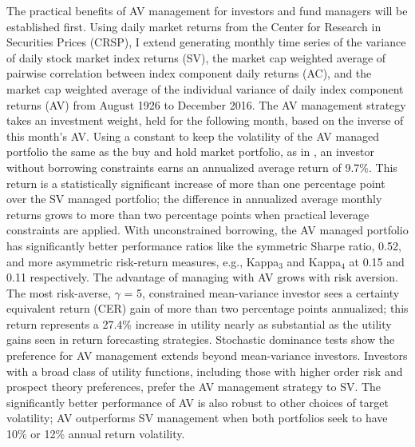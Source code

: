 The practical benefits of AV management for investors and fund managers will be established first. Using daily market returns from the Center for Research in Securities Prices (CRSP), I extend \citet{pollet_average_2010} generating monthly time series of the variance of daily stock market index returns (SV), the market cap weighted average of pairwise correlation between index component daily returns (AC), and the market cap weighted average of the individual variance of daily index component returns (AV) from August 1926 to December 2016. The AV management strategy takes an investment weight, held for the following month, based on the inverse of this month's AV. Using a constant to keep the volatility of the AV managed portfolio the same as the buy and hold market portfolio, as in \citet{moreira_volatility-managed_2017}, an investor without borrowing constraints earns an annualized average return of 9.7\%. This return is a statistically significant increase of more than one percentage point over the SV managed portfolio; the difference in annualized average monthly returns grows to more than two percentage points when practical leverage constraints are applied. With unconstrained borrowing, the AV managed portfolio has significantly better performance ratios like the symmetric Sharpe ratio, 0.52, and more asymmetric risk-return measures, e.g., Kappa$_{3}$ and Kappa$_{4}$ at 0.15 and 0.11 respectively. The advantage of managing with AV grows with risk aversion. The most risk-averse, $\gamma$ = 5, constrained mean-variance investor sees a certainty equivalent return (CER) gain of more than two percentage points annualized; this return represents a 27.4\% increase in utility nearly as substantial as the utility gains seen in return forecasting strategies. \citep{campbell1997econometrics} Stochastic dominance tests show the preference for AV management extends beyond mean-variance investors. Investors with a broad class of utility functions, including those with higher order risk and prospect theory preferences, prefer the AV management strategy to SV. 
The significantly better performance of AV is also robust to other choices of target volatility; AV outperforms SV management when both portfolios seek to have 10\% or 12\% annual return volatility. 

